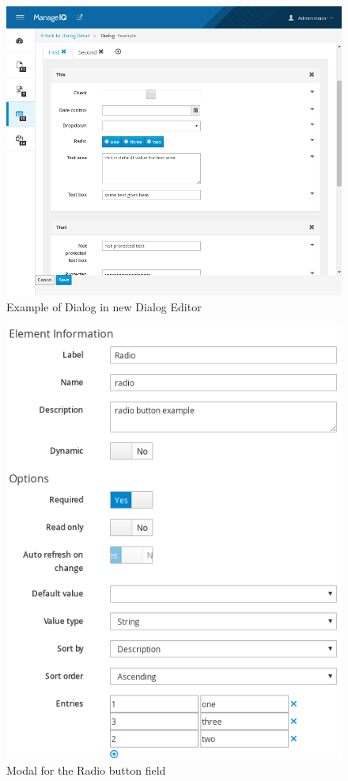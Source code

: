   \begin{figure}
    \centering
    \def\svgwidth{\columnwidth}
    \includegraphics[width=13cm,keepaspectratio]{fig/dialog-edit}
    \caption{Example of Dialog in new Dialog Editor}\label{fig:dialog-edit}
  \end{figure}

  \begin{figure}
    \centering
    \def\svgwidth{\columnwidth}
    \includegraphics[width=12cm,keepaspectratio]{fig/dialog-modal}
    \caption{Modal for the Radio button field}\label{fig:dialog-modal}
  \end{figure}
